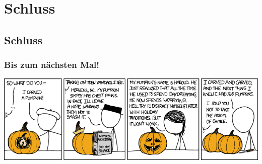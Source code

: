 \section{Schluss}
\subsection{Schluss}

\begin{frame}
\frametitle{Bis zum nächsten Mal!}
\vspace{0.3cm}
\begin{center}
	\resizebox{11.85cm}{!} {%
	\includegraphics[height=0.8\textheight]{images/xkcd_804.png}%
	}
\end{center}
\end{frame}


